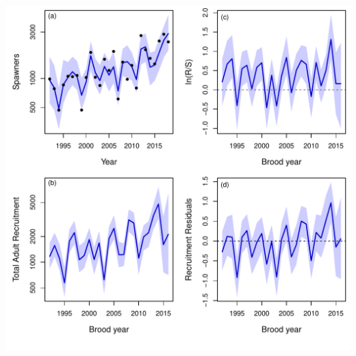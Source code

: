 \documentclass[
  11pt,
]{article}
\begin{document}
\includegraphics{App_2_Summarize_results_Spring_Chinook_files/figure-latex/plot_escapement_Recruitment_Innovations-1.pdf}
\end{document}
